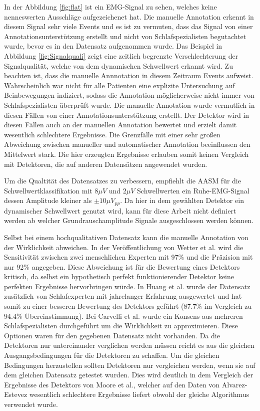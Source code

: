 In der Abbildung \ref{fig:flat} ist ein EMG-Signal zu sehen, welches keine nenneswerten Ausschläge aufgezeichenet hat.
Die manuelle Annotation erkennt in diesem Signal sehr viele Events und es ist zu vermuten, dass das Signal von einer Annotationsunterstützung erstellt und nicht von Schlafspezialisten begutachtet wurde, bevor es in den Datensatz aufgenommen wurde.
Das Beispiel in Abbildung \ref{fig:Signalquali} zeigt eine zeitlich begrenzte Verschlechterung der Signalqualität, welche von dem dynamischen Schwellwert erkannt wird.
Zu beachten ist, dass die manuelle Annnotation in diesem Zeitraum Events aufweist.
Wahrscheinlich war nicht für alle Patienten eine explizite Untersuchung auf Beinbewegungen indiziert, sodass die Annotation möglicherweise nicht immer von Schlafspezialisten überprüft wurde. Die manuelle Annotation wurde vermutlich in diesen Fällen von einer Annotationsunterstützung erstellt.
Der Detektor wird in diesen Fällen auch an der manuellen Annotation bewertet und erzielt damit wesentlich schlechtere Ergebnisse. Die Grenzfälle mit einer sehr großen Abweichung zwischen manueller und automatischer Annotation beeinflussen den Mittelwert stark.
Die hier erzeugten Ergebnisse erlauben somit keinen Vergleich mit Detektoren, die auf anderen Datensätzen angewendet wurden.

Um die Qualtität des Datensatzes zu verbessern, empfiehlt die AASM für die Schwellwertklassifikation mit $8 \mu V$ und $2 \mu V$ Schwellwerten ein Ruhe-EMG-Signal dessen Amplitude kleiner als $\pm 10 \mu V_{pp}$. Da hier in dem gewählten Detektor ein dynamischer Schwellwert genutzt wird, kann für diese Arbeit nicht definiert werden ab welcher Grundrauschamplitude Signale ausgeschlossen werden können.


Selbst bei einem hochqualitativen Datensatz kann die manuelle Annotation von der Wirklichkeit abweichen. In der Veröffentlichung von Wetter et al. wird die Sensitivität zwischen zwei menschlichen Experten mit 97\% und die Präzision mit nur 92\% angegeben. Diese Abweichung ist für die Bewertung eines Detektors kritisch, da selbst ein hypothetisch perfekt funktionierender Detektor keine perfekten Ergebnisse hervorbringen würde. 
In Huang et al. wurde der Datensatz zusätzlich von Schlafexperten mit jahrelanger Erfahrung ausgewertet und hat somit zu einer besseren Bewertung des Detektors geführt (87.7\% im Vergleich zu 94.4\% Übereinstimmung). Bei Carvelli et al. wurde ein Konsens aus mehreren Schlafspezialisten durchgeführt um die Wirklichkeit zu approximieren. 
Diese Optionen waren für den gegebenen Datensatz nicht vorhanden. 
Da die Detektoren nur untereinander verglichen werden müssen reicht es aus die gleichen Ausgangsbedingungen für die Detektoren zu schaffen. Um die gleichen Bedingungen herzustellen sollten Detektoren nur vergleichen werden, wenn sie auf dem gleichen Datensatz getestet wurden.
Dies wird deutlich in dem Vergleich der Ergebnisse des Detektors von Moore et al., welcher auf den Daten von Alvarez-Estevez wesentlich schlechtere Ergebnisse liefert obwohl der gleiche Algorithmus verwendet wurde.


